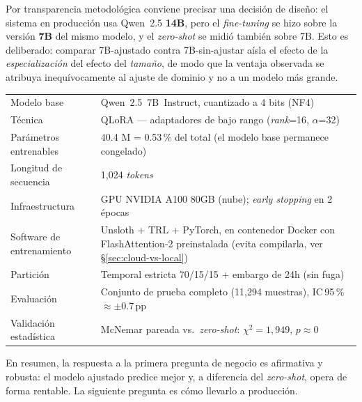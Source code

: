 \documentclass[11pt]{article}
\begin{document}
Por transparencia metodol\'ogica conviene precisar una decisi\'on de dise\~no: el sistema en producci\'on usa Qwen~2.5 \textbf{14B}, pero el \textit{fine-tuning} se hizo sobre la versi\'on \textbf{7B} del mismo modelo, y el \textit{zero-shot} se midi\'o tambi\'en sobre 7B. Esto es deliberado: comparar 7B-ajustado contra 7B-sin-ajustar a\'isla el efecto de la \textit{especializaci\'on} del efecto del \textit{tama\~no}, de modo que la ventaja observada se atribuya inequ\'ivocamente al ajuste de dominio y no a un modelo m\'as grande.

\begin{tcolorbox}[colback=black!3, colframe=black!45, boxrule=0.7pt, arc=1.5mm, title={\sffamily\bfseries Ficha t\'ecnica del modelo (para stakeholders t\'ecnicos)}, fonttitle=\sffamily\bfseries\color{white}, colbacktitle=black!55, boxsep=3pt, left=5pt, right=5pt]
\footnotesize
\begin{tabularx}{\linewidth}{lX}
Modelo base & Qwen~2.5~7B~Instruct, cuantizado a 4 bits (NF4) \\
T\'ecnica & QLoRA --- adaptadores de bajo rango (\textit{rank}=16, $\alpha$=32) \\
Par\'ametros entrenables & 40.4 M = 0.53\,\% del total (el modelo base permanece congelado) \\
Longitud de secuencia & 1{,}024 \textit{tokens} \\
Infraestructura & GPU NVIDIA A100 80GB (nube); \textit{early stopping} en 2 \'epocas \\
Software de entrenamiento & Unsloth + TRL + PyTorch, en contenedor Docker con FlashAttention-2 preinstalada (evita compilarla, ver \S\ref{sec:cloud-vs-local}) \\
Partici\'on & Temporal estricta 70/15/15 + embargo de 24h (sin fuga) \\
Evaluaci\'on & Conjunto de prueba completo (11{,}294 muestras), IC\,95\,\% $\approx\pm$0.7\,pp \\
Validaci\'on estad\'istica & McNemar pareada vs.\ \textit{zero-shot}: $\chi^2=1{,}949$, $p\approx0$ \\
\end{tabularx}
\end{tcolorbox}

En resumen, la respuesta a la primera pregunta de negocio es afirmativa y robusta: el modelo ajustado predice mejor y, a diferencia del \textit{zero-shot}, opera de forma rentable. La siguiente pregunta es c\'omo llevarlo a producci\'on.

\end{document}
